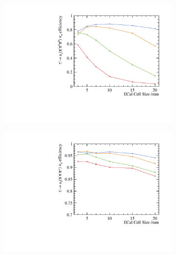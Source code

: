 \documentclass[a4paper,11pt]{article}
\begin{document}
\begin{figure}[htbp]
\begin{subfigure}[b]{0.45\textwidth}
  \includegraphics[width=\textwidth]{plots/decayMode4}
  \caption{}
  \label{fig:decayMode4}
\end{subfigure}
\hfill
\begin{subfigure}[b]{0.45\textwidth}
  \includegraphics[width=\textwidth]{plots/decayMode5}
  \caption{}
  \label{fig:decayMode5}
\end{subfigure}



\end{figure}
\end{document}
